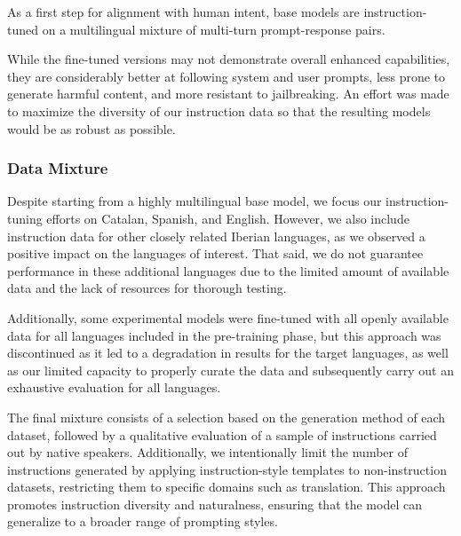 As a first step for alignment with human intent, base models are instruction-tuned \cite{instructgpt, scaling-it-models} on a multilingual mixture of multi-turn prompt-response pairs.

While the fine-tuned versions may not demonstrate overall enhanced capabilities, they are considerably better at following system and user prompts, less prone to generate harmful content, and more resistant to jailbreaking. An effort was made to maximize the diversity of our instruction data so that the resulting models would be as robust as possible.

\subsubsection{Data Mixture}
\label{subsec:it-data}
Despite starting from a highly multilingual base model, we focus our instruction-tuning efforts on Catalan, Spanish, and English. However, we also include instruction data for other closely related Iberian languages, as we observed a positive impact on the languages of interest. That said, we do not guarantee performance in these additional languages due to the limited amount of available data and the lack of resources for thorough testing.

Additionally, some experimental models were fine-tuned with all openly available data for all languages included in the pre-training phase, but this approach was discontinued as it led to a degradation in results for the target languages, as well as our limited capacity to properly curate the data and subsequently carry out an exhaustive evaluation for all languages.

The final mixture consists of a selection based on the generation method of each dataset, followed by a qualitative evaluation of a sample of instructions carried out by native speakers. Additionally, we intentionally limit the number of instructions generated by applying instruction-style templates to non-instruction datasets, restricting them to specific domains such as translation. This approach promotes instruction diversity and naturalness, ensuring that the model can generalize to a broader range of prompting styles.

